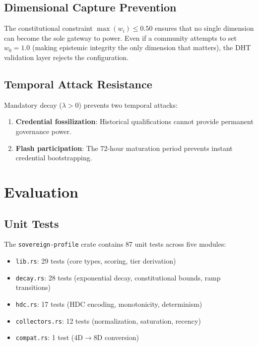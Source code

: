 \documentclass[11pt,twocolumn]{article}
\begin{document}
\subsection{Dimensional Capture Prevention}

The constitutional constraint $\max(w_i) \leq 0.50$ ensures that no single dimension can become the sole gateway to power. Even if a community attempts to set $w_0 = 1.0$ (making epistemic integrity the only dimension that matters), the DHT validation layer rejects the configuration.

\subsection{Temporal Attack Resistance}

Mandatory decay ($\lambda > 0$) prevents two temporal attacks:
\begin{enumerate}[nosep]
  \item \textbf{Credential fossilization}: Historical qualifications cannot provide permanent governance power.
  \item \textbf{Flash participation}: The 72-hour maturation period prevents instant credential bootstrapping.
\end{enumerate}

\section{Evaluation}
\label{sec:evaluation}

\subsection{Unit Tests}

The \texttt{sovereign-profile} crate contains 87 unit tests across five modules:
\begin{itemize}[nosep]
  \item \texttt{lib.rs}: 29 tests (core types, scoring, tier derivation)
  \item \texttt{decay.rs}: 28 tests (exponential decay, constitutional bounds, ramp transitions)
  \item \texttt{hdc.rs}: 17 tests (HDC encoding, monotonicity, determinism)
  \item \texttt{collectors.rs}: 12 tests (normalization, saturation, recency)
  \item \texttt{compat.rs}: 1 test (4D$\to$8D conversion)
\end{itemize}
\end{document}
